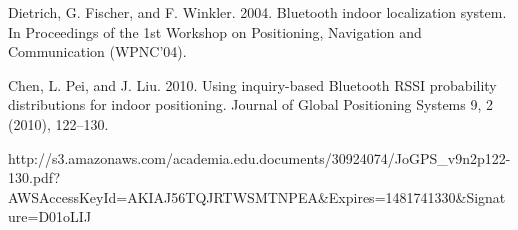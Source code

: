 Dietrich, G. Fischer, and F. Winkler. 2004. Bluetooth indoor localization system. In Proceedings of the 1st
Workshop on Positioning, Navigation and Communication (WPNC’04).

Chen, L. Pei, and J. Liu. 2010. Using inquiry-based Bluetooth RSSI probability distributions for indoor
positioning. Journal of Global Positioning Systems 9, 2 (2010), 122–130.

http://s3.amazonaws.com/academia.edu.documents/30924074/JoGPS_v9n2p122-130.pdf?AWSAccessKeyId=AKIAJ56TQJRTWSMTNPEA&Expires=1481741330&Signature=D01oLIJ%


